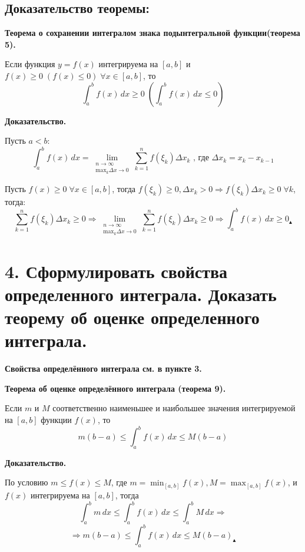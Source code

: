 \documentclass[11pt]{article}
\begin{document}
\subsection*{Доказательство теоремы:}
\par\textbf{Теорема о сохранении интегралом знака подынтегральной функции(теорема 5).}
\par Если функция $y = f(x)$ интегрируема на $[a, b]$ и $f(x) \geq 0 \; (f(x) \leq 0) \; \forall x \in [a, b]$, то $$\int_{a}^b f(x) \, dx \geq 0 \; \left( \int_{a}^b f(x) \, dx \leq 0 \right)$$
\par\textbf{Доказательство.}
\par Пусть $a < b$: $$\int_{a}^b f(x) \, dx = \lim_{ \substack{n \to \infty \\ \text{max}_{k}\Delta x \to 0}} \sum_{k = 1}^n f(\xi_{k}) \Delta x_{k}\text{ , где } \Delta x_{k} = x_{k} - x_{k - 1}$$
\par Пусть $f(x) \geq 0 \; \forall x \in [a, b]$, тогда $f(\xi_{k}) \geq 0, \Delta x_{k} > 0 \Rightarrow f(\xi_{k}) \Delta x_{k} \geq 0 \; \forall k$, тогда: $$\sum_{k=1}^n f(\xi_{k}) \Delta x_{k} \geq 0 \Rightarrow \lim_{ \substack{n \to \infty \\ \text{max}_{k}\Delta x \to 0}} \sum_{k = 1}^n f(\xi_{k}) \Delta x_{k} \geq 0 \Rightarrow \int_{a}^b f(x) \, dx \geq 0 _\blacktriangle$$

\section*{4. Сформулировать свойства определенного интеграла. Доказать теорему об оценке определенного интеграла.}
\par\textbf{Свойства определённого интеграла см. в пункте 3.}
\par\textbf{Теорема об оценке определённого интеграла (теорема 9).}
\par Если $m$ и $M$ соответственно наименьшее и наибольшее значения интегрируемой на $[a, b]$ функции $f(x)$, то $$m(b - a) \leq \int_{a}^b f(x) \, dx \leq M(b - a)$$
\par\textbf{Доказательство.}
\par По условию $m \leq f(x) \leq M$, где $m = \min_{[a, b]} f(x), M = \max_{[a, b]} f(x)$, и $f(x)$ интегрируема на $[a, b]$, тогда
$$\int_a^b  m \, dx \leq \int_{a}^b f(x)\, dx  \leq \int_{a}^b M \, dx \Rightarrow$$
$$\Rightarrow m(b - a) \leq \int_{a}^b f(x)\, dx \leq M(b - a) _\blacktriangle$$
\end{document}
